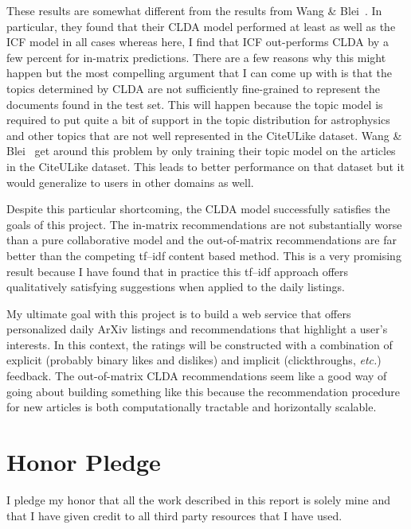 \documentclass[11pt]{article}
\begin{document}
These results are somewhat different from the results from Wang \&
Blei~.
In particular, they found that their CLDA model performed at least as well as
the ICF model in all cases whereas here, I find that ICF out-performs CLDA by
a few percent for in-matrix predictions.
There are a few reasons why this might happen but the most compelling argument
that I can come up with is that the topics determined by CLDA are not
sufficiently fine-grained to represent the documents found in the test set.
This will happen because the topic model is required to put quite a bit of
support in the topic distribution for astrophysics and other topics that are
not well represented in the CiteULike dataset.
Wang \& Blei~ get around this problem by only training their
topic model on the articles in the CiteULike dataset.
This leads to better performance on that dataset but it would generalize to
users in other domains as well.

Despite this particular shortcoming, the CLDA model successfully satisfies the
goals of this project.
The in-matrix recommendations are not substantially worse than a pure
collaborative model and the out-of-matrix recommendations are far better than
the competing tf--idf content based method.
This is a very promising result because I have found that in practice this
tf--idf approach offers qualitatively satisfying suggestions when applied to
the daily listings.

My ultimate goal with this project is to build a web service that offers
personalized daily ArXiv listings and recommendations that highlight a user's
interests.
In this context, the ratings will be constructed with a combination of
explicit (probably binary likes and dislikes) and implicit (clickthroughs,
\emph{etc.}) feedback.
The out-of-matrix CLDA recommendations seem like a good way of going about
building something like this because the recommendation procedure for new
articles is both computationally tractable and horizontally scalable.

\section{Honor Pledge}
I pledge my honor that all the work described in this report is solely mine
and that I have given credit to all third party resources that I have used.
\end{document}
